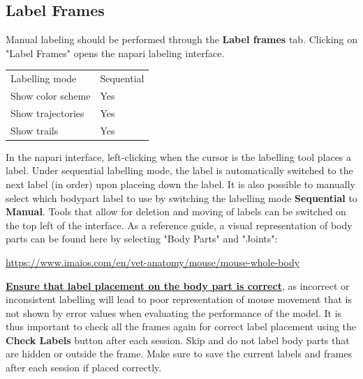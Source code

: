 \documentclass[11pt]{article}
\renewcommand{\[}{%
  \par\smallskip\noindent
  \begin{center}%
  \setlength{\fboxsep}{5pt}%
  \setlength{\fboxrule}{0.35pt}%
  \begin{lrbox}{\almaEquationBox}%
  $\displaystyle
}
\renewcommand{\]}{%
  $%
  \end{lrbox}%
  \fcolorbox{equationLine}{equationBack}{\usebox{\almaEquationBox}}%
  \end{center}%
  \smallskip\par
}
\begin{document}
\subsection{Label Frames}\label{sec:label-frames}

Manual labeling should be performed through the \textbf{Label frames} tab. Clicking on "Label Frames" opens the napari labeling interface.

\begin{tcolorbox}[software settings,title=\textbf{Napari Interface: Recommended Settings}]
\begin{tabularx}{\linewidth}{KV}
Labelling mode & Sequential \\
Show color scheme & Yes \\
Show trajectories & Yes \\
Show trails & Yes \\
\end{tabularx}
\end{tcolorbox}

In the napari interface, left-clicking when the cursor is the labelling tool places a label. Under sequential labelling mode, the label is automatically switched to the next label (in order) upon placeing down the label. It is also possible to manually select which bodypart label to use by switching the labelling mode \textbf{Sequential} to \textbf{Manual}. Tools that allow for deletion and moving of labels can be switched on the top left of the interface. As a reference guide, a visual representation of body parts can be found here by selecting "Body Parts" and "Joints": 

\begin{tcolorbox}
\url{https://www.imaios.com/en/vet-anatomy/mouse/mouse-whole-body}
\end{tcolorbox}

\underline{\textbf{Ensure that label placement on the body part is correct}}, as incorrect or inconsistent labelling will lead to poor representation of mouse movement that is not shown by error values when evaluating the performance of the model. It is thus important to check all the frames again for correct label placement using the \textbf{Check Labels} button after each session. Skip and do not label body parts that are hidden or outside the frame. Make sure to save the current labels and frames after each session if placed correctly. 
\end{document}
